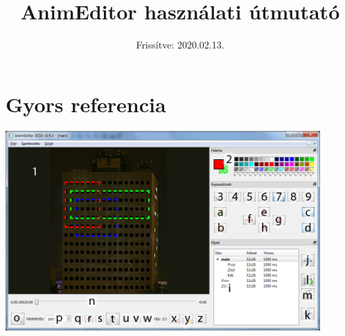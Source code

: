 \documentclass[a4paper,12pt,release]{article}
\title{AnimEditor használati útmutató}
\date{Frissítve: 2020.02.13.}
\begin{document}
\maketitle
\newpage
\tableofcontents
\clearpage
\section{Gyors referencia}
\includegraphics[width=0.9\textwidth]{pics/main.jpg}\\
\end{document}

